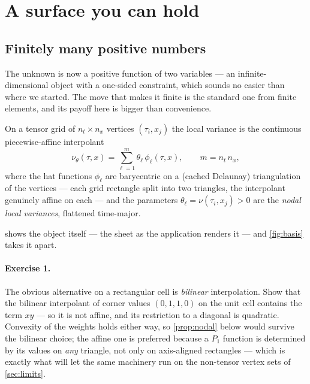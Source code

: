 \documentclass[11pt]{article}
\begin{document}
\section{A surface you can hold}
\label{sec:p1}

\subsection{Finitely many positive numbers}

The unknown is now a positive function of two variables --- an
infinite-dimensional object with a one-sided constraint, which sounds no
easier than where we started.  The move that makes it finite is the standard
one from finite elements, and its payoff here is bigger than convenience.

\begin{definition}
\label{def:p1}
On a tensor grid of $n_t\times n_x$ vertices $(\tau_i,x_j)$ the local
variance is the continuous piecewise-affine interpolant
\begin{equation}
\nu_\theta(\tau,x)=\sum_{\ell=1}^{m}\theta_\ell\,\phi_\ell(\tau,x),
\qquad m=n_t\,n_x,
\label{eq:p1}
\end{equation}
where the hat functions $\phi_\ell$ are barycentric on a (cached Delaunay)
triangulation of the vertices --- each grid rectangle split into two
triangles, the interpolant genuinely affine on each --- and the parameters
$\theta_\ell=\nu(\tau_i,x_j)>0$ are the \emph{nodal local variances},
flattened time-major.
\end{definition}

 shows the object itself --- the sheet as the application
renders it --- and \cref{fig:basis} takes it apart.

\paragraph{Exercise 1.}  The obvious alternative on a rectangular cell is
\emph{bilinear} interpolation.  Show that the bilinear interpolant of
corner values $(0,1,1,0)$ on the unit cell contains the term $xy$ --- so it
is not affine, and its restriction to a diagonal is quadratic.  Convexity
of the weights holds either way, so \cref{prop:nodal} below would survive
the bilinear choice; the affine one is preferred because a $P_1$ function
is determined by its values on \emph{any} triangle, not only on
axis-aligned rectangles --- which is exactly what will let the same
machinery run on the non-tensor vertex sets of \cref{sec:limits}.
\end{document}
